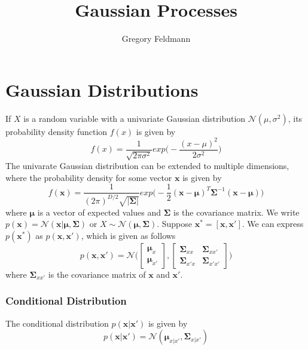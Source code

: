 \documentclass[]{article}
\title{Gaussian Processes}
\author{Gregory Feldmann}
\begin{document}
\maketitle

\section{Gaussian Distributions}
If $X$ is a random variable with a univariate Gaussian distribution $\mathcal{N}(\mu, \sigma^{2})$, its probability density function $f(x)$ is given by
\begin{equation} f(x) = \frac{1}{\sqrt{2\pi \sigma^{2}}} exp\bigg(-\frac{(x-\mu)^{2}}{2\sigma^{2}}\bigg) \end{equation}
The univarate Gaussian distribution can be extended to multiple dimensions, where the probability density for some vector $\bm{x}$ is given by
\begin{equation} f(\bm{x}) = \frac{1}{(2\pi)^{D/2}\sqrt{| \bm{\Sigma} |}} exp\bigg( -\frac{1}{2}(\bm{x}-\bm{\mu})^{T}\bm{\Sigma}^{-1}(\bm{x}-\bm{\mu}) \bigg) \end{equation}
where $\bm{\mu}$ is a vector of expected values and $\bm{\Sigma}$ is the covariance matrix. We write $p(\bm{x}) = \mathcal{N}(\bm{x}|\bm{\mu}, \bm{\Sigma})$ or $X \sim \mathcal{N}(\bm{\mu}, \bm{\Sigma})$.
\newline
\newline
Suppose $\bm{x}^{*} = [\bm{x}, \bm{x}']$. We can express $p(\bm{x}^{*})$ as $p(\bm{x}, \bm{x}')$, which is given as follows
\begin{equation} p(\bm{x}, \bm{x}') = \mathcal{N}\Bigg(
\begin{bmatrix}
\bm{\mu}_{x} \\
\bm{\mu}_{x'}
\end{bmatrix},
\begin{bmatrix}
\bm{\Sigma}_{xx} & \bm{\Sigma}_{xx'} \\
\bm{\Sigma}_{x'x} & \bm{\Sigma}_{x'x'}
\end{bmatrix}
  \Bigg) \end{equation}
where $\bm{\Sigma}_{xx'}$ is the covariance matrix of $\bm{x}$ and $\bm{x}'$.
\subsubsection{Conditional Distribution}
The conditional distribution $p(\bm{x} | \bm{x}')$ is given by
\begin{equation} p(\bm{x} | \bm{x}') = \mathcal{N}(\bm{\mu}_{x|x'},\bm{\Sigma}_{x|x'}) \end{equation}
\end{document}
